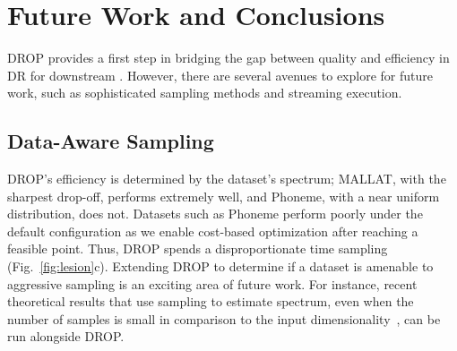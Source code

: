 \section{Future Work and Conclusions}
\label{subsec:disc}

DROP provides a first step in bridging the gap between quality and efficiency in DR for downstream .
However, there are several avenues to explore for future work, such as sophisticated sampling methods and streaming execution.

\subsection{Data-Aware Sampling}

DROP's efficiency is determined by the dataset's spectrum; MALLAT, with the sharpest drop-off, performs extremely well, and Phoneme, with a near uniform distribution, does not.
Datasets such as Phoneme perform poorly under the default configuration as we enable cost-based optimization after reaching a feasible point.
Thus, DROP spends a disproportionate time sampling (Fig.~\ref{fig:lesion}c). 
Extending DROP to determine if a dataset is amenable to aggressive sampling is an exciting area of future work. 
For instance, recent theoretical results that use sampling to estimate spectrum, even when the number of samples is small in comparison to the input dimensionality~\cite{estspec}, can be run alongside DROP.

